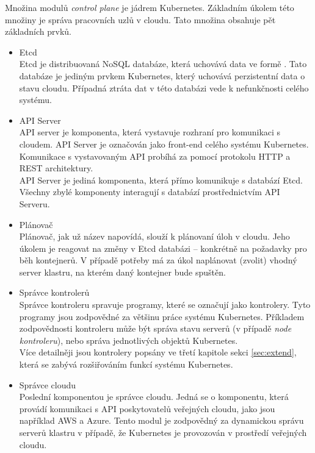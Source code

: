Množina modulů \textit{control plane} je jádrem Kubernetes. Základním úkolem této množiny je správa pracovních uzlů v cloudu. \cite{thekubernetesauthors_2022_kubernetes} Tato množina obsahuje pět základních prvků.
\begin{itemize}
    \item Etcd\\
    Etcd je distribuovaná NoSQL databáze, která uchovává data  ve formě . Tato databáze je jediným prvkem Kubernetes, který uchovává perzistentní data o stavu cloudu. Případná ztráta dat v této databázi vede k nefunkčnosti celého systému.
    \item API Server\\
    API server je komponenta, která vystavuje rozhraní pro komunikaci s cloudem. API Server je označován jako front-end celého systému Kubernetes. Komunikace s vystavovaným API probíhá za pomocí protokolu HTTP a REST architektury.\\
    API Server je jediná komponenta, která přímo komunikuje s databází Etcd. Všechny zbylé komponenty interagují s databází prostřednictvím API Serveru.
    \item Plánovač\\
    Plánovač, jak už název napovídá, slouží k plánovaní úloh v cloudu. Jeho úkolem je reagovat na změny v Etcd databázi -- konkrétně na požadavky pro běh kontejnerů. V případě potřeby má za úkol naplánovat (zvolit) vhodný server klastru, na kterém daný kontejner bude spuštěn.  
    \item Správce kontrolerů\\
    Správce kontroleru spravuje programy, které se označují jako kontrolery. Tyto programy jsou zodpovědné za většinu práce systému Kubernetes. Příkladem zodpovědnosti kontroleru může být správa stavu serverů (v případě \textit{node kontroleru}), nebo správa jednotlivých objektů Kubernetes.\\
    Více detailněji jsou kontrolery popsány ve třetí kapitole sekci \ref{sec:extend}, která se zabývá rozšiřováním funkcí systému Kubernetes. 
    \item Správce cloudu\\
    Poslední komponentou je správce cloudu. Jedná se o komponentu, která provádí komunikaci s API poskytovatelů veřejných cloudu, jako jsou například AWS a Azure. Tento modul je zodpovědný za dynamickou správu serverů klastru v případě, že Kubernetes je provozován v prostředí veřejných cloudu.  
\end{itemize}

